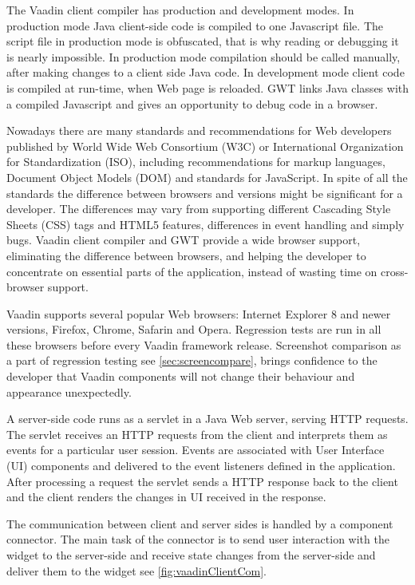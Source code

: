    The Vaadin client compiler has production and development modes. 
   In production mode Java  client-side code is compiled to one Javascript file. The script file in
   production mode is obfuscated, that is why reading or debugging it is nearly
   impossible. In production mode compilation should be called manually,
   after making changes to a client side Java code.
   In development mode client code is compiled at run-time, when Web page
   is reloaded. GWT links Java classes  with a compiled Javascript and gives
   an opportunity to debug code in a browser.
  
   Nowadays there are many standards and recommendations for Web
   developers published by World Wide Web Consortium (W3C) or  International
   Organization for Standardization (ISO), including recommendations for
   markup languages, Document Object Models (DOM) and standards
   for JavaScript. In spite of all the standards the difference between browsers
   and versions might be significant for a developer. The differences may vary
   from supporting different Cascading Style Sheets (CSS) tags
   and HTML5 features, differences in event handling and simply bugs. Vaadin
   client compiler and GWT provide a wide browser support, eliminating the difference between browsers,
    and helping the
   developer to concentrate on essential parts of the application, instead of
   wasting time on cross-browser support. 
   
   Vaadin supports several popular Web browsers: Internet Explorer 8 and newer
   versions, Firefox, Chrome, Safarin and Opera. Regression tests are run
   in all these browsers before every Vaadin framework release. Screenshot
   comparison as a part of regression testing see \ref{sec:screencompare},
   brings confidence to the developer that Vaadin components will not change
   their behaviour and appearance unexpectedly.
   
   A server-side code runs as a servlet in a Java Web server, serving HTTP
   requests. The servlet receives an HTTP requests from the client and
   interprets them as events for a particular user session.
   Events are associated with User Interface (UI) components and delivered to
   the event listeners defined in the application. After processing a request
   the servlet sends a HTTP response back to the client and the client renders
   the changes in UI received in the response.
   
   The communication between client and server sides is handled by a component
   connector. The main task of the connector is to send user interaction
   with the widget to the server-side and receive state changes from the server-side 
   and deliver them to the widget see \ref{fig:vaadinClientCom}. 
    
